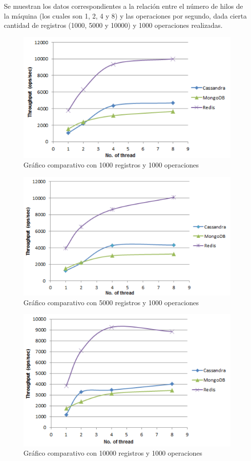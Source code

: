 \documentclass[twocolumn]{article}
\begin{document}
Se muestran los datos correspondientes a la relación entre el número de hilos de la máquina (los cuales son 1, 2, 4 y 8) y las operaciones por segundo, dada cierta cantidad de registros (1000, 5000 y 10000) y 1000 operaciones realizadas.

\begin{figure}[h]
  \includegraphics[width = \columnwidth]{img/03_g1.png}
  \caption{Gráfico comparativo con 1000 registros y 1000 operaciones}
\end{figure}

\begin{figure}[h]
  \includegraphics[width = \columnwidth]{img/04_g2.png}
  \caption{Gráfico comparativo con 5000 registros y 1000 operaciones}
\end{figure}

\begin{figure}[h]
  \includegraphics[width = \columnwidth]{img/05_g3.png}
  \caption{Gráfico comparativo con 10000 registros y 1000 operaciones}
\end{figure}
\end{document}
